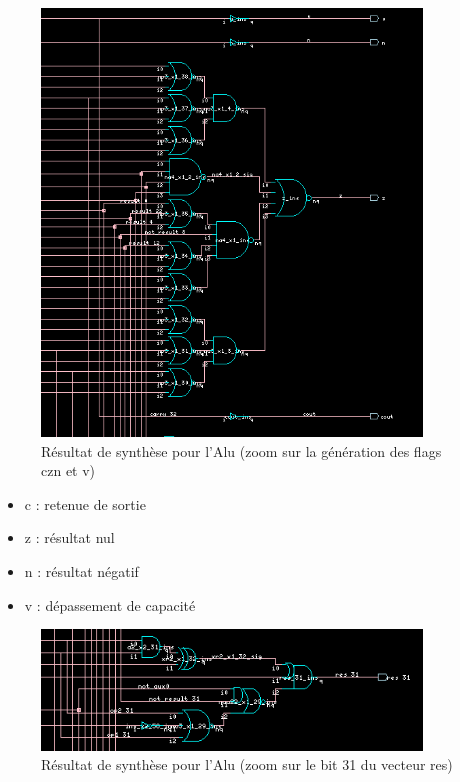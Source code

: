 \documentclass[10pt,a4paper]{article}
\begin{document}
			\begin{figure}[H]															%
				\centering 																%
				\includegraphics[width=0.9\textwidth]{alu_cznv_XSCH.png} 				%
				\caption{Résultat de synthèse pour l'Alu (zoom sur la génération des flags czn et v)}
				\label{Fig.main2} 														%
			\end{figure}
			
			\begin{itemize}															%
				\item c : retenue de sortie
				\item z : résultat nul
				\item n : résultat négatif 
				\item v : dépassement de capacité
			\end{itemize}

			\begin{figure}[H]															%
				\centering 																%
				\includegraphics[width=0.9\textwidth]{alu_res_XSCH.png} 				%
				\caption{Résultat de synthèse pour l'Alu (zoom sur le bit 31 du vecteur res)}%
				\label{Fig.main2} 														%
			\end{figure}
			
\end{document}

